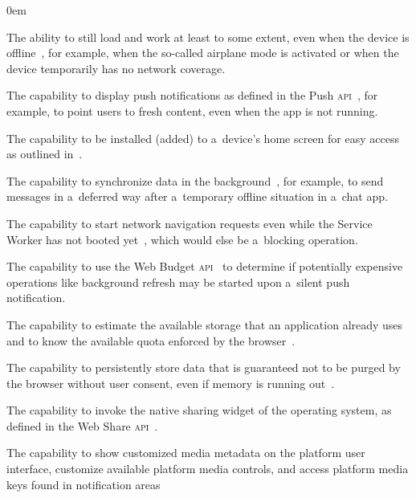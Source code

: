 \documentclass[sigconf]{acmart}
\begin{document}
\begin{description}
  \itemsep0em 
  \item[Offline Capabilities] The ability to still load and work
    at least to some extent, even when the device is offline~\cite{russell2017serviceworkers},
    for example, when the so-called airplane mode is activated
    or when the device temporarily has no network coverage.
  \item[Push Notifications] The capability to display push notifications as defined in
    the Push \textsc{api}~\cite{beverloo2017pushapi}, for example,
    to point users to fresh content, even when the app is not running.
  \item[Add to Home Screen] The capability to be installed (added) to a~device's home screen
    for easy access as outlined in~\cite{kinlan2017a2hs}.
  \item[Background Sync] The capability to synchronize data
    in the background~\cite{russell2017serviceworkers},
    for example, to send messages in a~deferred way
    after a~temporary offline situation in a~chat app.
  \item[Navigation Preload] The capability to start network navigation requests
    even while the Service Worker has not booted yet~\cite{archibald2017navigationpreload},
    which would else be a~blocking operation.
  \item[Silent Push] The capability to use the Web Budget
    \textsc{api}~\cite{beverloo2017budgetapi}
    to determine if potentially expensive operations
    like background refresh may be started
    upon a~silent push notification.
  \item[Storage Estimation] The capability to estimate the available storage
    that an application already uses and to know the available quota enforced by the
    browser~\cite{vankesteren2018storage}.
  \item[Persistent Storage] The capability to persistently store data
    that is guaranteed not to be purged by the browser without user consent,
    even if memory is running out~\cite{vankesteren2018storage}.
  \item[Web Share] The capability to invoke the native sharing widget
    of the operating system, as defined in the Web Share \textsc{api}~\cite{giuca2017webshare}.
  \item[Media Session] The capability to show customized media metadata
    on the platform user interface, customize available platform media controls,
    and access platform media keys found in notification areas

\end{description}
\end{document}
